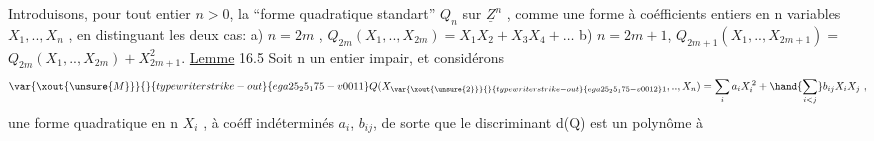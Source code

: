 Introduisons, pour tout entier  $n>0$, la ``forme quadratique standart''
$Q_n$ sur $\underline{Z}^n$ , comme une forme à coéfficients entiers en n variables
$X_1,..,X_n$ ,  en distinguant les deux cas:
a)  $n = 2m$  ,  $Q_{2m}(X_1,..,X_{2m}) = X_1X_2 + X_3X_4 + \ldots$
b)  $n = 2m+1$,  $Q_{2m+1}(X_1,..,X_{2m+1}) =$ $Q_{2m}(X_1,..,X_{2m}) + X_{2m+1}^2$.
\uline{Lemme} 16.5  Soit n un entier impair, et considérons
\[ \var{\xout{\unsure{M}}}{}{typewriter strike-out}{ega25_25_175-v0011}Q(X_{\var{\xout{\unsure{2}}}{}{typewriter strike-out}{ega25_25_175-v0012}1},..,X_n) = \sum_i a_iX_i^{\,2} + \hand{\sum_{i<j}} b_{ij}X_iX_j \ , \]
une forme quadratique en n  $X_i$ , à coéff indéterminés
$a_i$, $b_{ij}$, de sorte que le discriminant  d(Q)  est un polynôme à

